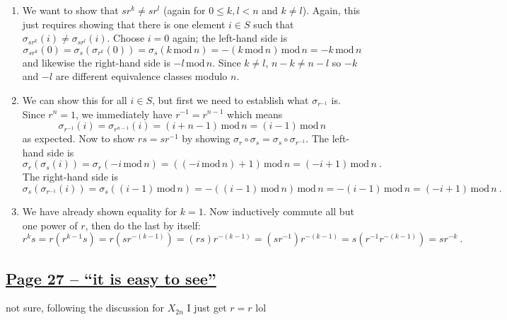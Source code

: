 \documentclass[]{article}
\newcommand{\md}{\,\text{mod}\,}
\begin{document}
\begin{enumerate}
\item We want to show that $sr^k \neq sr^l$ (again for $0\leq k,l < n$ and $k\neq l$). Again, this just requires showing that there is one element $i \in S$ such that $\sigma_{sr^k}(i) \neq \sigma_{sr^l}(i)$. Choose $i=0$ again; the left-hand side is
\begin{equation}
\sigma_{sr^k}(0) = \sigma_s(\sigma_{r^k}(0)) = \sigma_s(k\md n) = -(k\md n) \md n = -k\md n
\end{equation}
and likewise the right-hand side is $-l\md n$. Since $k\neq l$, $n-k \neq n-l$ so $-k$ and $-l$ are different equivalence classes modulo $n$.


\item We can show this for all $i\in S$, but first we need to establish what $\sigma_{r^{-1}}$ is. Since $r^n = 1$, we immediately have $r^{-1} = r^{n-1}$ which means
\begin{equation}
\sigma_{r^{-1}}(i) = \sigma_{r^{n-1}}(i) = (i+n-1)\md n = (i-1)\md n
\end{equation}
as expected. Now to show $rs = sr^{-1}$ by showing $\sigma_r \circ \sigma_s = \sigma_s \circ \sigma_{r^{-1}}$. The left-hand side is
\begin{equation}
\sigma_r(\sigma_s(i)) = \sigma_r(-i \md n) = ((-i\md n)+ 1)\md n = (-i+1) \md n\ .
\end{equation}
The right-hand side is
\begin{equation}
\sigma_s(\sigma_{r^{-1}}(i)) = \sigma_s( (i-1)\md n) = -((i-1)\md n)\md n = -(i-1)\md n = (-i+1)\md n\ .
\end{equation}


\item We have already shown equality for $k=1$. Now inductively commute all but one power of $r$, then do the last by itself:
\begin{equation}
r^ks = r(r^{k-1}s) = r(sr^{-(k-1)}) = (rs)r^{-(k-1)} = (sr^{-1})r^{-(k-1)} = s(r^{-1}r^{-(k-1)}) = sr^{-k}\ .
\end{equation}

\end{enumerate}




\subsection*{\underline{Page 27 -- ``it is easy to see''}}
{\color{red} not sure, following the discussion for $X_{2n}$ I just get $r = r$ lol}
\end{document}

